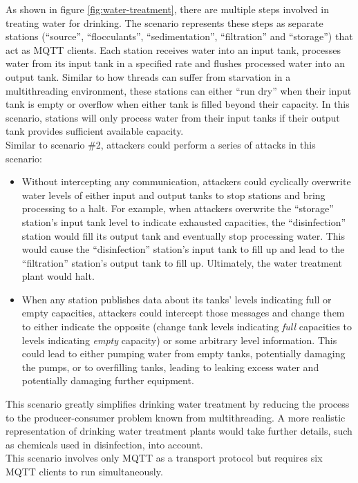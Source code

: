 As shown in figure \ref{fig:water-treatment}, there are multiple steps involved in treating water for drinking. The scenario represents these steps as separate stations (\enquote{source}, \enquote{flocculants}, \enquote{sedimentation}, \enquote{filtration} and \enquote{storage}) that act as \ac{MQTT} clients. Each station receives water into an input tank, processes water from its input tank in a specified rate and flushes processed water into an output tank. Similar to how threads can suffer from starvation in a multithreading environment, these stations can either \enquote{run dry} when their input tank is empty or overflow when either tank is filled beyond their capacity. In this scenario, stations will only process water from their input tanks if their output tank provides sufficient available capacity.\\
Similar to scenario \#2, attackers could perform a series of attacks in this scenario:
\begin{itemize}
    \item Without intercepting any communication, attackers could cyclically overwrite water levels of either input and output tanks to stop stations and bring processing to a halt. For example, when attackers overwrite the \enquote{storage} station's input tank level to indicate exhausted capacities, the \enquote{disinfection} station would fill its output tank and eventually stop processing water. This would cause the \enquote{disinfection} station's input tank to fill up and lead to the \enquote{filtration} station's output tank to fill up. Ultimately, the water treatment plant would halt.
    \item When any station publishes data about its tanks' levels indicating full or empty capacities, attackers could intercept those messages and change them to either indicate the opposite (change tank levels indicating \emph{full} capacities to levels indicating \emph{empty} capacity) or some arbitrary level information. This could lead to either pumping water from empty tanks, potentially damaging the pumps, or to overfilling tanks, leading to leaking excess water and potentially damaging further equipment.
\end{itemize}
This scenario greatly simplifies drinking water treatment by reducing the process to the producer-consumer problem known from multithreading. A more realistic representation of drinking water treatment plants would take further details, such as chemicals used in disinfection, into account.\\
This scenario involves only \ac{MQTT} as a transport protocol but requires six \ac{MQTT} clients to run simultaneously.


